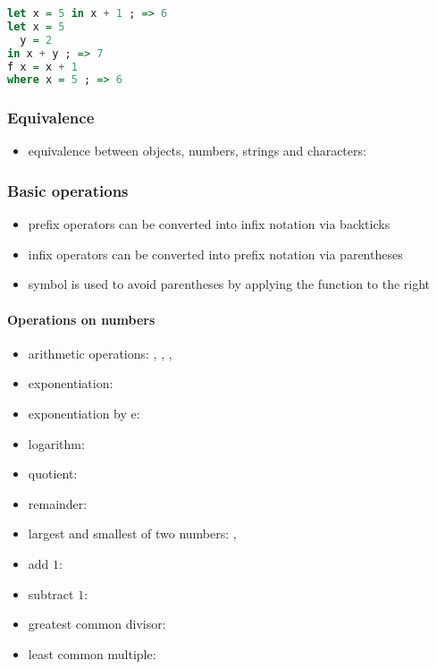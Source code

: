 \documentclass[a4paper,landscape,10pt]{article}
\begin{document}
\begin{multicols*}{2}
  \begin{lstlisting}[language=Haskell]
let x = 5 in x + 1 ; => 6
let x = 5
  y = 2
in x + y ; => 7
f x = x + 1
where x = 5 ; => 6
\end{lstlisting}

  \subsubsection{Equivalence}

  \begin{itemize}
    \item equivalence between objects, numbers, strings and characters: \ihaskell{==}
  \end{itemize}

  \subsubsection{Basic operations}

  \begin{itemize}
    \item prefix operators can be converted into infix notation via backticks 
    \item infix operators can be converted into prefix notation via parentheses 
    \item symbol \ihaskell{\$} is used to avoid parentheses by applying the function to the right
  \end{itemize}

  \breakcolumn

  \paragraph{Operations on numbers}

  \begin{itemize}
    \item arithmetic operations: \ihaskell{+}, \ihaskell{-}, \ihaskell{*}, \ihaskell{/}
    \item exponentiation: \ihaskell{**}
    \item exponentiation by e: 
    \item logarithm: 
    \item quotient: 
    \item remainder: 
    \item largest and smallest of two numbers: , 
    \item add \(1\): 
    \item subtract \(1\): 
    \item greatest common divisor: 
    \item least common multiple: 
  \end{itemize}


\end{multicols*}
\end{document}
